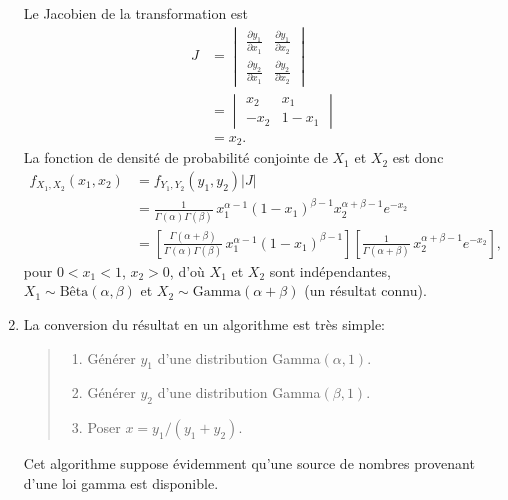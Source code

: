 \begin{exercice}
\begin{sol}
\begin{enumerate}
      Le Jacobien de la transformation est
      \begin{align*}
        J
        &=
        \begin{vmatrix}
          \frac{\partial y_1}{\partial x_1} &
          \frac{\partial y_1}{\partial x_2} \\
          \frac{\partial y_2}{\partial x_1} &
          \frac{\partial y_2}{\partial x_2}
        \end{vmatrix} \\
        &=
        \begin{vmatrix}
          x_2 & x_1 \\
          -x_2 & 1 - x_1
        \end{vmatrix} \\
        &=
        x_2.
      \end{align*}
      La fonction de densité de probabilité conjointe de $X_1$ et $X_2$
      est donc
      \begin{align*}
        f_{X_1,X_2}(x_1, x_2)
        &= f_{Y_1, Y_2}(y_1, y_2) |J| \\
        &= \frac{1}{\Gamma(\alpha) \Gamma(\beta)}\,
        x_1^{\alpha - 1} (1 - x_1)^{\beta - 1}
        x_2^{\alpha + \beta - 1} e^{-x_2} \\
        &=
        \left[
          \frac{\Gamma(\alpha + \beta)}{\Gamma(\alpha) \Gamma(\beta)}\,
          x_1^{\alpha - 1} (1 - x_1)^{\beta - 1}
        \right]
        \left[
          \frac{1}{\Gamma(\alpha + \beta)}\,
          x_2^{\alpha + \beta - 1} e^{-x_2}
        \right],
      \end{align*}
      pour $0 < x_1 < 1$, $x_2 > 0$, d'où $X_1$ et $X_2$ sont
      indépendantes, $X_1 \sim \text{Bêta}(\alpha, \beta)$ et $X_2
      \sim \text{Gamma}(\alpha + \beta)$ (un résultat connu).
    \item La conversion du résultat en un algorithme est très simple:
      \begin{quote}
        \begin{enumerate}[1.]
        \item Générer $y_1$ d'une distribution Gamma$(\alpha, 1)$.
        \item Générer $y_2$ d'une distribution Gamma$(\beta, 1)$.
        \item Poser $x = y_1/(y_1 + y_2)$.
        \end{enumerate}
      \end{quote}
      Cet algorithme suppose évidemment qu'une source de nombres
      provenant d'une loi gamma est disponible.


\end{enumerate}
\end{sol}
\end{exercice}
